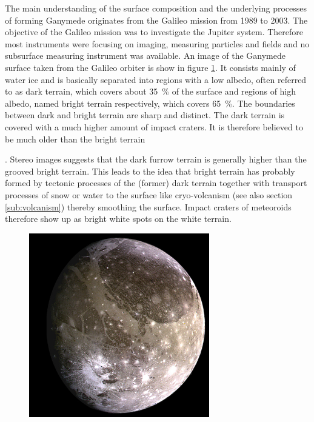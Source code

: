 The main understanding of the surface composition and the underlying
processes of forming Ganymede originates from the Galileo mission
from 1989 to 2003. The objective of the Galileo mission was to investigate
the Jupiter system. Therefore most instruments were focusing on imaging,
measuring particles and fields and no subsurface measuring instrument
was available. An image of the Ganymede surface taken from the Galileo
orbiter is show in figure \ref{fig:Ganymed-true-color}. It consists
mainly of water ice and is basically separated into regions with a
low albedo, often referred to as dark terrain, which covers about
35~\% of the surface and regions of high albedo, named bright terrain
respectively, which covers 65~\%. The boundaries between dark and
bright terrain are sharp and distinct. The dark terrain is covered
with a much higher amount of impact craters. It is therefore believed
to be much older than the bright terrain%

. Stereo images suggests that the dark furrow terrain is generally
higher than the grooved bright terrain. This leads to the idea that
bright terrain has probably formed by tectonic processes of the (former)
dark terrain together with transport processes of snow or water to
the surface like cryo-volcanism (see also section \ref{sub:volcanism})
thereby smoothing the surface. Impact craters of meteoroids therefore
show up as bright white spots on the white terrain. 

\begin{figure}
\begin{centering}
\includegraphics[width=0.70\textwidth]{Figures/Ganymede_true_color}
\par\end{centering}

\caption{\label{fig:Ganymed-true-color}}


\end{figure}




